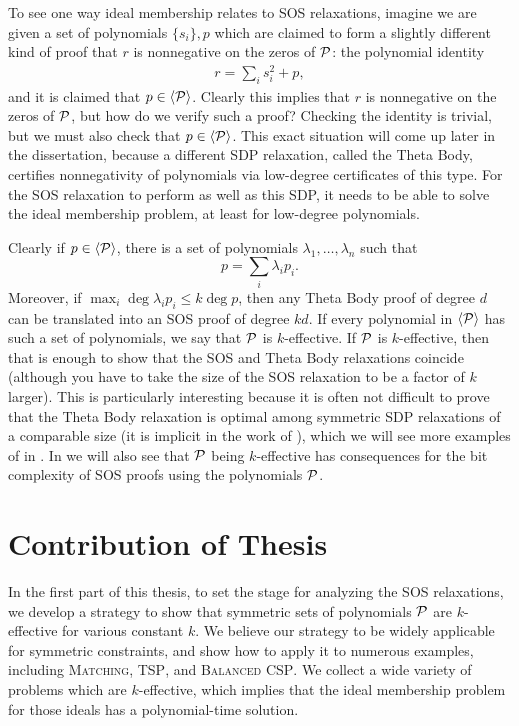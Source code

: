 To see one way ideal membership relates to SOS relaxations, imagine we are given a set of polynomials $\{s_i\}, p$ which are claimed to form a slightly different kind of proof that $r$ is nonnegative on the zeros of $\mathcal P$: the polynomial identity
\begin{align}
r = \sum_i s_i^2 + p,
\end{align}
and it is claimed that $p \in \langle \mathcal P \rangle$. Clearly this implies that $r$ is nonnegative on the zeros of $\mathcal P$, but how do we verify such a proof? Checking the identity is trivial, but we must also check that $p \in \langle \mathcal P \rangle$.  
This exact situation will come up later in the dissertation, because a different SDP relaxation, called the Theta Body, certifies nonnegativity of polynomials via low-degree certificates of this type. 
For the SOS relaxation to perform as well as this SDP, it needs to be able to solve the ideal membership problem, at least for low-degree polynomials. 

Clearly if $p \in \langle \mathcal P \rangle$, there is a set of polynomials $\lambda_1, \dots, \lambda_n$ such that 
\[p = \sum_i \lambda_i p_i.\]
Moreover, if $\max_i \deg \lambda_ip_i \leq k\deg p$, then any Theta Body proof of degree $d$ can be translated into an SOS proof of degree $kd$. 
If every polynomial in $\langle \mathcal P \rangle$ has such a set of polynomials, we say that $\mathcal P$ is $k$-effective. 
If $\mathcal P$ is $k$-effective, then that is enough to show that the SOS and Theta Body relaxations coincide (although you have to take the size of the SOS relaxation to be a factor of $k$ larger). 
This is particularly interesting because it is often not difficult to prove that the Theta Body relaxation is optimal among symmetric SDP relaxations of a comparable size (it is implicit in the work of \cite{LRST14}), which we will see more examples of in . In  we will also see that $\mathcal P$ being $k$-effective has consequences for the bit complexity of SOS proofs using the polynomials $\mathcal P$.

\section{Contribution of Thesis}\label{sec:intro_contrib}

In the first part of this thesis, to set the stage for analyzing the SOS relaxations, we develop a strategy to show that symmetric sets of polynomials $\mathcal P$ are $k$-effective for various constant $k$. 
We believe our strategy to be widely applicable for symmetric constraints, and show how to apply it to numerous examples, including \textsc{Matching}, \textsc{TSP}, and \textsc{Balanced CSP}. 
We collect a wide variety of problems which are $k$-effective, which implies that the ideal membership problem for those ideals has a polynomial-time solution. 

